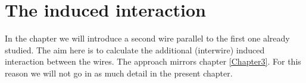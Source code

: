 
\chapter{The induced interaction} %

\label{Chapter8} %


In the chapter we will introduce a second wire parallel to the first one already studied. The aim here is to calculate the additional (interwire) induced interaction between the wires. The approach mirrors chapter \ref{Chapter3}. For this reason we will not go in as much detail in the present chapter.
